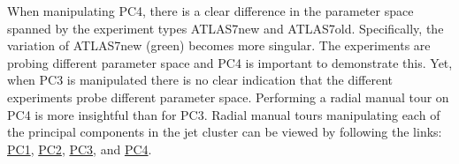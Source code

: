 When manipulating PC4, there is a clear difference in the parameter
space spanned by the experiment types ATLAS7new and ATLAS7old.
Specifically, the variation of ATLAS7new (green) becomes more singular.
The experiments are probing different parameter space and PC4 is
important to demonstrate this. Yet, when PC3 is manipulated there is no
clear indication that the different experiments probe different
parameter space. Performing a radial manual tour on PC4 is more
insightful than for PC3. Radial manual tours manipulating each of the
principal components in the jet cluster can be viewed by following the
links:
\href{https://nspyrison.netlify.com/thesis/jetcluster_manualtour_pc1/}{PC1},
\href{https://nspyrison.netlify.com/thesis/jetcluster_manualtour_pc2/}{PC2},
\href{https://nspyrison.netlify.com/thesis/jetcluster_manualtour_pc3/}{PC3},
and
\href{https://nspyrison.netlify.com/thesis/jetcluster_manualtour_pc4/}{PC4}.

